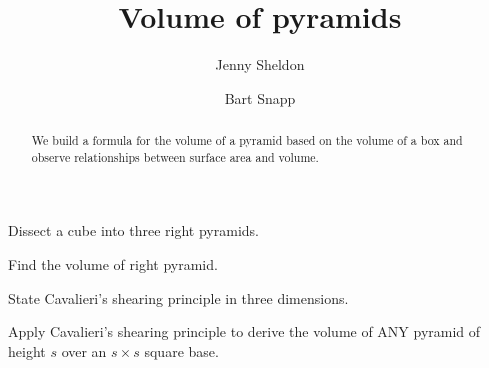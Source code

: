 \documentclass[nooutcomes,noauthor,handout,hints,12pt]{ximera}
\title{Volume of pyramids}
\author{Jenny Sheldon \and Bart Snapp}
\begin{document}
\begin{abstract}
  We build a formula for the volume of a pyramid based on the volume
  of a box and observe relationships between surface area and volume.
\end{abstract}
\maketitle


\begin{listOutcomes}
\item Dissect a cube into three right pyramids.
\item Find the volume of right pyramid.
\item State Cavalieri's shearing principle in three dimensions.
\item Apply Cavalieri's shearing principle to derive the volume of ANY pyramid
  of height $s$ over an $s\times s$ square base.
\end{listOutcomes}



\mynewpage
\end{document}
